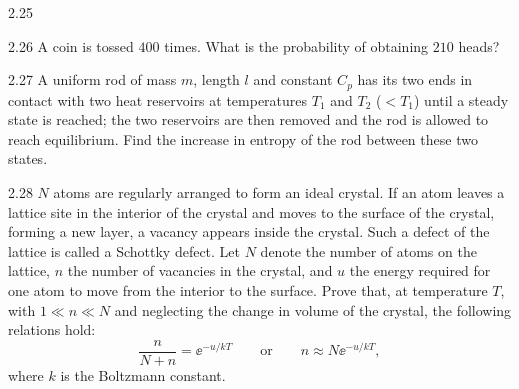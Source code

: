 \begin{figbox}{2.25}
\end{figbox}

\begin{problem}{2.26}
A coin is tossed $400$ times. What is the probability of obtaining $210$ heads?
\end{problem}

\begin{problem}{2.27}
A uniform rod of mass $m$, length $l$ and constant $C_p$ has its two ends in contact with two heat reservoirs at temperatures $T_1$ and $T_2$ ($< T_1$) until a steady state is reached; the two reservoirs are then removed and the rod is allowed to reach equilibrium. Find the increase in entropy of the rod between these two states.
\end{problem}

\begin{problem}{2.28}
$N$ atoms are regularly arranged to form an ideal crystal. If an atom leaves a lattice site in the interior of the crystal and moves to the surface of the crystal, forming a new layer, a vacancy appears inside the crystal. Such a defect of the lattice is called a Schottky defect. Let $N$ denote the number of atoms on the lattice, $n$ the number of vacancies in the crystal, and $u$ the energy required for one atom to move from the interior to the surface. Prove that, at temperature $T$, with $1\ll n\ll N$ and neglecting the change in volume of the crystal, the following relations hold:
\[
\frac{n}{N+n} = \ee^{-u/kT}
\qquad\text{or}\qquad
n \approx N\ee^{-u/kT},
\]
where $k$ is the Boltzmann constant.
\end{problem}
